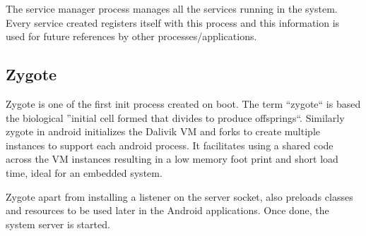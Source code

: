 The service manager process manages all the services running in the system.
Every service created registers itself with this process and this information
is used for future references by other processes/applications.

\subsection{Zygote}

Zygote is one of the first init process created on boot. The term ``zygote`` is based the biological ''initial cell formed
that divides to produce offsprings``. Similarly zygote in android initializes the Dalivik VM and
forks to create multiple instances to support each android process. It facilitates using a shared code
across the VM instances resulting in a low memory foot print and short load time, ideal for an embedded system.

Zygote apart from installing a listener on the server socket, also preloads classes and
resources to be used later in the Android applications. Once done, the system server is started.

  
  

